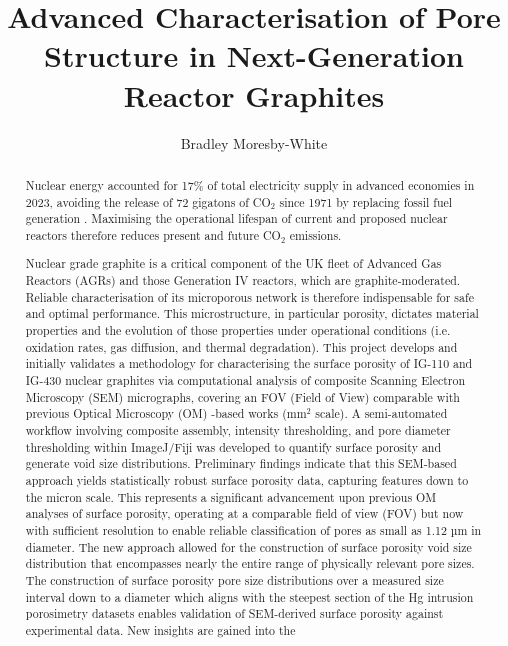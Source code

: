\documentclass[3p,twocolumn]{elsarticle}
\begin{document}
\begin{frontmatter}
\title{Advanced Characterisation of Pore Structure in Next-Generation Reactor Graphites}
\author[inst1]{Bradley Moresby-White}
\address[inst1]{University of Plymouth, Plymouth, UK}
\begin{abstract}
    
Nuclear energy accounted for 17\% of total electricity supply 
in advanced economies in 2023, avoiding the release of 72 gigatons of CO$_2$
since 1971 by replacing fossil fuel generation \cite{IEA2025NewEraNuclear}.
Maximising the operational lifespan of current and proposed nuclear reactors 
therefore reduces present and future CO$_2$ emissions.

Nuclear grade graphite is a critical component of the UK fleet of Advanced Gas
Reactors (AGRs) and those Generation IV reactors, which are graphite-moderated.
Reliable characterisation of its microporous network is therefore indispensable
for safe and optimal performance. This microstructure, in particular porosity,
dictates material properties and the evolution of those properties under
operational conditions (i.e. oxidation rates, gas diffusion, and thermal
degradation). This project develops and initially validates a methodology for
characterising the surface porosity of IG-110 and IG-430 nuclear graphites via
computational analysis of composite Scanning Electron Microscopy (SEM)
micrographs, covering an FOV (Field of View) comparable with previous Optical
Microscopy (OM) -based works (mm\(^2\) scale). A semi-automated workflow
involving composite assembly, intensity thresholding, and pore diameter
thresholding within ImageJ/Fiji was developed to quantify surface porosity and
generate void size distributions. Preliminary findings indicate that this
SEM-based approach yields statistically robust surface porosity data, capturing
features down to the micron scale. This represents a significant advancement
upon previous OM analyses of surface porosity, operating at a comparable field
of view (FOV) but now with sufficient resolution to enable reliable
classification of pores as small as 1.12 µm in diameter. The new approach
allowed for the construction of surface porosity void size distribution that
encompasses nearly the entire range of physically relevant pore sizes. The
construction of surface porosity pore size distributions over a measured size
interval down to a diameter which aligns with the steepest section of the Hg
intrusion porosimetry datasets enables validation of SEM-derived surface
porosity against experimental data. New insights are gained into the

\end{abstract}
\end{frontmatter}
\end{document}
